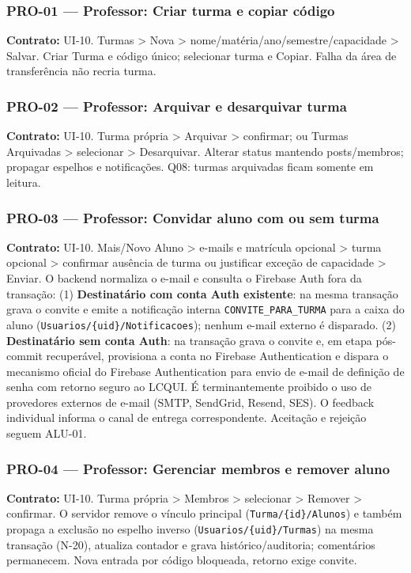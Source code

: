\subsubsection{PRO-01 --- Professor: Criar turma e copiar código}
\textbf{Contrato:} UI-10. Turmas > Nova > nome/matéria/ano/semestre/capacidade > Salvar. Criar Turma e código único; selecionar turma e Copiar. Falha da área de transferência não recria turma.

\subsubsection{PRO-02 --- Professor: Arquivar e desarquivar turma}
\textbf{Contrato:} UI-10. Turma própria > Arquivar > confirmar; ou Turmas Arquivadas > selecionar > Desarquivar. Alterar status mantendo posts/membros; propagar espelhos e notificações. Q08: turmas arquivadas ficam somente em leitura.

\subsubsection{PRO-03 --- Professor: Convidar aluno com ou sem turma}
\textbf{Contrato:} UI-10. Mais/Novo Aluno > e-mails e matrícula opcional > turma opcional > confirmar ausência de turma ou justificar exceção de capacidade > Enviar. O backend normaliza o e-mail e consulta o Firebase Auth fora da transação:
(1) \textbf{Destinatário com conta Auth existente}: na mesma transação grava o convite e emite a notificação interna \texttt{CONVITE\_PARA\_TURMA} para a caixa do aluno (\texttt{Usuarios/\{uid\}/Notificacoes}); nenhum e-mail externo é disparado.
(2) \textbf{Destinatário sem conta Auth}: na transação grava o convite e, em etapa pós-commit recuperável, provisiona a conta no Firebase Authentication e dispara o mecanismo oficial do Firebase Authentication para envio de e-mail de definição de senha com retorno seguro ao LCQUI. É terminantemente proibido o uso de provedores externos de e-mail (SMTP, SendGrid, Resend, SES).
O feedback individual informa o canal de entrega correspondente. Aceitação e rejeição seguem ALU-01.

\subsubsection{PRO-04 --- Professor: Gerenciar membros e remover aluno}
\textbf{Contrato:} UI-10. Turma própria > Membros > selecionar > Remover > confirmar. O servidor remove o vínculo principal (\texttt{Turma/\{id\}/Alunos}) e também propaga a exclusão no espelho inverso (\texttt{Usuarios/\{uid\}/Turmas}) na mesma transação (N-20), atualiza contador e grava histórico/auditoria; comentários permanecem. Nova entrada por código bloqueada, retorno exige convite.


